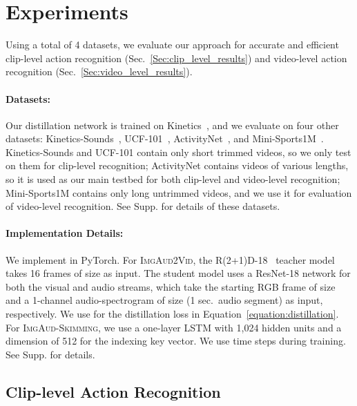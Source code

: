 \section{Experiments}\label{sec:results}
\vspace{-0.05in}

Using a total of 4 datasets, we evaluate our approach for accurate and efficient clip-level action recognition (Sec.~\ref{Sec:clip_level_results}) and video-level action recognition (Sec.~\ref{Sec:video_level_results}).

\vspace{-0.05in}
\paragraph{Datasets:} Our distillation network is trained on Kinetics~\cite{kay2017kinetics}, and we evaluate on four other datasets: Kinetics-Sounds~\cite{arandjelovic2017look}, UCF-101~\cite{soomro2012ucf101}, ActivityNet~\cite{caba2015activitynet}, and Mini-Sports1M~\cite{karpathy2014large}. Kinetics-Sounds and UCF-101 contain only short trimmed videos, so we only test on them for clip-level recognition; ActivityNet contains videos of various lengths, so it is used as our main testbed for both clip-level and video-level recognition; Mini-Sports1M contains only long untrimmed videos, and we use it for evaluation of video-level recognition. See Supp. for details of these datasets.

\vspace{-0.05in}
\paragraph{Implementation Details:} We implement in PyTorch. For \textsc{ImgAud2Vid}, the R(2+1)D-18~\cite{tran2018closer} teacher model takes 16 frames of size  as input. The student model uses a ResNet-18 network for both the visual and audio streams, which take the starting RGB frame of size  and a 1-channel audio-spectrogram of size  (1 sec.~audio segment) as input, respectively. We use  for the distillation loss in Equation~\ref{equation:distillation}. For \textsc{ImgAud-Skimming}, we use a one-layer LSTM with 1,024 hidden units and a dimension of 512 for the indexing key vector.  We use  time steps during training. See Supp. for details.

\vspace{-0.05in}
\subsection{Clip-level Action Recognition}~\label{Sec:clip_level_results}
\vspace{-0.2in}

